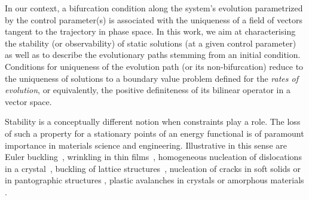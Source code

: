 In our context, a bifurcation condition along the system's evolution parametrized by the control parameter(s) is associated with  the uniqueness of a field of vectors tangent to the trajectory in phase space.
In this work, we aim at characterising the stability (or observability) of static solutions (at a given control parameter) as well as to describe the evolutionary paths stemming from an initial condition. Conditions for uniqueness of the evolution path (or its non-bifurcation) reduce to the uniqueness of solutions to a boundary value problem defined for the \emph{rates of evolution}, or equivalently, the positive definiteness of its bilinear operator in a vector space.

Stability is a conceptually different notion when constraints play a role.
The loss of such a property for a stationary points of an energy functional is of paramount importance in materials science and engineering. Illustrative in this sense are Euler buckling~\cite{Bettiol2020-ey}, wrinkling in thin films~\cite{Hutchinson2013-jk}, homogeneous nucleation of dislocations in a crystal~\cite{Carpio2005-bv,Plans2007-cx,Baggio2019-rs,Mayer2022-km,Baggio2023-qu}, buckling of lattice structures~\cite{Combescure2016-dy,Bertoldi2008-au}, nucleation of cracks in soft solids or in pantographic structures \cite{Riccobelli2023-fc,Salman2021-mn}, plastic  avalanches in crystals or amorphous materials \cite{Zhang2020-ax,Weiss2021-db,Yang2020-zm}.

